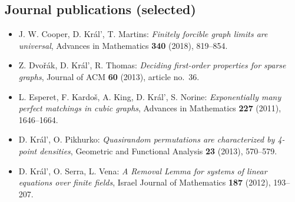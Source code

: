 \documentclass[11pt]{article}
\begin{document}
\subsection*{Journal publications (selected)}
\begin{itemize}
\item J. W. Cooper, D. Kr\'al', T. Martins: {\it Finitely forcible graph limits are universal\/}, Advances in Mathematics {\bf 340} (2018), 819--854.
\item Z. Dvo\v{r}\'ak, D. Kr\'al', R. Thomas: {\it Deciding first-order properties for sparse graphs\/}, Journal of ACM {\bf 60} (2013), article no.~36.
\item L. Esperet, F. Kardo\v s, A. King, D. Kr\'al', S. Norine: {\it Exponentially many perfect matchings in cubic graphs\/}, Advances in Mathematics {\bf 227} (2011), 1646--1664.
\item D. Kr\'al', O. Pikhurko: {\it Quasirandom permutations are characterized by 4-point densities\/}, Geometric and Functional Analysis {\bf 23} (2013), 570--579.
\item D. Kr\'al', O. Serra, L. Vena: {\it A Removal Lemma for systems of linear equations over finite fields\/}, Israel Journal of Mathematics {\bf 187} (2012), 193--207.
\end{itemize}
\end{document}
